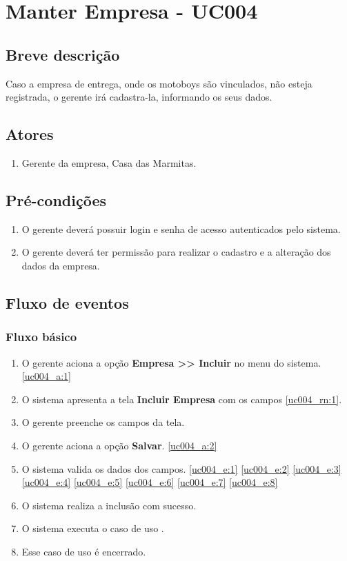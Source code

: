 \chapter{Manter Empresa - UC004} \label{uc004}

\section{Breve descrição}

Caso a empresa de entrega, onde os motoboys são vinculados, não esteja registrada, o gerente irá cadastra-la, informando os seus dados.

\section{Atores}

\begin{enumerate}
	\item Gerente da empresa, Casa das Marmitas.
\end{enumerate}

\section{Pré-condições}

\begin{enumerate}
	\item O gerente deverá possuir login e senha de acesso autenticados pelo sistema.
	\item O gerente deverá ter permissão para realizar o cadastro e a alteração dos dados da empresa.
\end{enumerate}

\section{Fluxo de eventos}

\subsection{Fluxo básico}

\begin{enumerate}[label=P\arabic*]
	\item O gerente aciona a opção \textbf{Empresa >> Incluir} no menu do sistema. \label{uc004_p:1}\ref{uc004_a:1}
	\item O sistema apresenta a tela \textbf{Incluir Empresa} com os campos \ref{uc004_rn:1}. \label{uc004_p:2}
	\item O gerente preenche os campos da tela. \label{uc004_p:3}
	\item O gerente aciona a opção \textbf{Salvar}. \label{uc004_p:4}\ref{uc004_a:2}
	\item O sistema valida os dados dos campos. \ref{uc004_e:1} \ref{uc004_e:2} \ref{uc004_e:3} \ref{uc004_e:4} \ref{uc004_e:5} \ref{uc004_e:6} \ref{uc004_e:7} \ref{uc004_e:8}
	\item O sistema realiza a inclusão com sucesso.
	\item O sistema executa o caso de uso .
	\item Esse caso de uso é encerrado.	
\end{enumerate}

